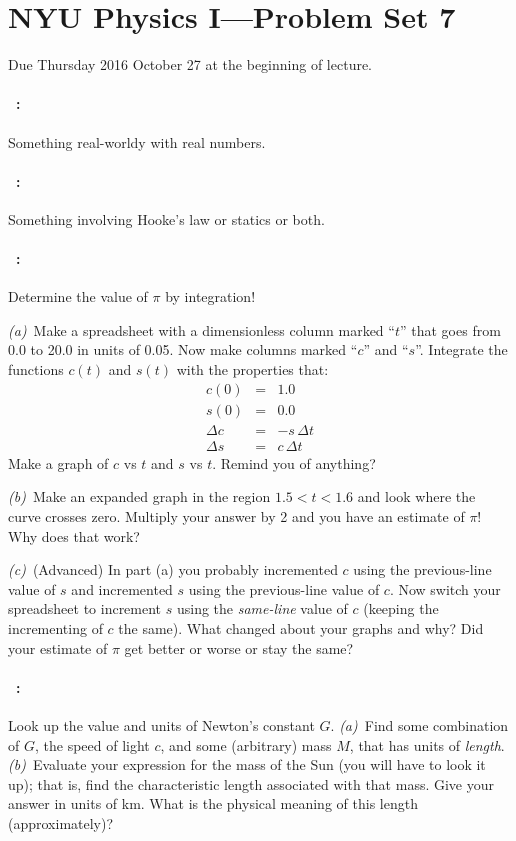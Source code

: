 \documentclass[12pt]{article}
\begin{document}
\section*{NYU Physics I---Problem Set 7}

Due Thursday 2016 October 27 at the beginning of lecture.

\paragraph{\problemname~\theproblem:}%
Something real-worldy with real numbers.

\paragraph{\problemname~\theproblem:}%
Something involving Hooke's law or statics or both.

\paragraph{\problemname~\theproblem:}%
Determine the value of $\pi$ by integration!

\textsl{(a)}~Make a spreadsheet with a dimensionless column marked
``$t$'' that goes from 0.0 to 20.0 in units of 0.05.  Now make columns
marked ``$c$'' and ``$s$''.  Integrate the functions $c(t)$ and
$s(t)$ with the properties that:
\begin{eqnarray}\displaystyle
c(0) & = & 1.0 \\
s(0) & = & 0.0 \\
\Delta c & = & -s\,\Delta t \\
\Delta s & = & c\,\Delta t
\end{eqnarray}
Make a graph of $c$ vs $t$ and $s$ vs $t$.  Remind you of anything?

\textsl{(b)}~Make an expanded graph in the region $1.5<t<1.6$ and
look where the curve crosses zero.  Multiply your answer by 2 and you
have an estimate of $\pi$!  Why does that work?

\textsl{(c)}~(Advanced) In part (a) you probably incremented $c$ using
the previous-line value of $s$ and incremented $s$ using the
previous-line value of $c$.  Now switch your spreadsheet to increment
$s$ using the \emph{same-line} value of $c$ (keeping the incrementing
of $c$ the same).  What changed about your graphs and why?  Did your
estimate of $\pi$ get better or worse or stay the same?

\paragraph{\problemname~\theproblem:}%
Look up the value and units of Newton's constant $G$.
\textsl{(a)}~Find some combination of $G$, the speed of light $c$, and
some (arbitrary) mass $M$, that has units of \emph{length}.
\textsl{(b)}~Evaluate your expression for the mass of the Sun (you
will have to look it up); that is, find the characteristic length
associated with that mass.  Give your answer in units of km.  What is
the physical meaning of this length (approximately)?
\end{document}
